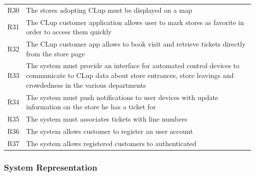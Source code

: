 \begin{tabular}{C{1cm}L{14.1cm}}
    R30   & The stores adopting CLup must be displayed on a map                                                                                                                             \\
    R31   & The CLup customer application allows user to mark stores as favorite in order to access them quickly                                                                            \\
    R32   & The CLup customer app allows to book visit and retrieve tickets directly from the store page                                                                \\
    R33   & The system must provide an interface for automated control devices to communicate to CLup data about store entrances, store leavings and crowdedness in the various departments \\
    R34   & The system must push notifications to user devices with update information on the store he has a ticket for                                                                     \\
    R35  & The system must associates tickets with line numbers                                                                                                                            \\
    R36 & The system allows customer to register an user account \\
    R37 & The system allows registered customers to authenticated \\

\end{tabular}
\vfill

\subsubsection{System Representation}



